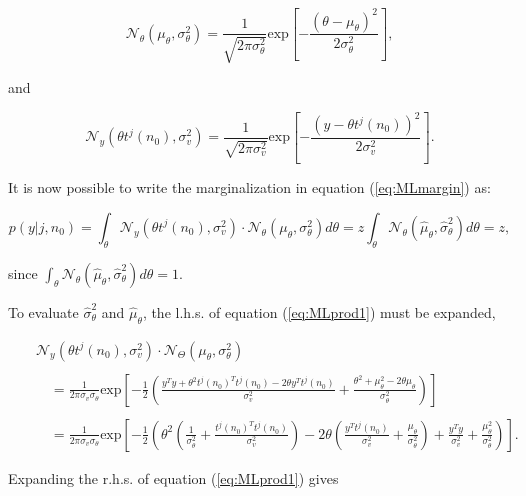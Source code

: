 \begin{equation}\label{eq:MLtheta2}
\mathcal{N}_\theta(\mu_\theta,\sigma^2_\theta) = \frac{1}{\sqrt{2 \pi \sigma_\theta^2}} \textrm{exp}\left[-\frac{\left(\theta - \mu_\theta\right)^2}{2\sigma_\theta^2}\right],
\end{equation}

and

\begin{equation}\label{eq:MLnoise2}
\mathcal{N}_y(\theta t^j(n_0),\sigma_v^2) = \frac{1}{\sqrt{2 \pi \sigma_v^2}} \textrm{exp}\left[-\frac{\left(y - \theta t^j\left(n_0\right)\right)^2}{2\sigma_v^2}\right].
\end{equation}

It is now possible to write the marginalization in equation (\ref{eq:MLmargin}) as:

\begin{equation}\label{eq:MLmargin2}
p(y|j,n_0)=\int_\theta \mathcal{N}_y(\theta t^j(n_0),\sigma_v^2)\cdot\mathcal{N}_\theta(\mu_\theta,\sigma^2_\theta) d\theta = z \int_\theta \mathcal{N}_\theta(\hat{\mu}_\theta,\hat{\sigma}^2_\theta) d\theta = z,
\end{equation}

since $\int_\theta \mathcal{N}_\theta(\hat{\mu}_\theta,\hat{\sigma}^2_\theta) d\theta = 1$.

To evaluate $\hat{\sigma}^2_\theta$ and $\hat{\mu}_\theta$, the l.h.s. of equation (\ref{eq:MLprod1}) must be expanded,

\begin{eqnarray}\label{eq:MLprod3}
& & \mathcal{N}_y(\theta t^j(n_0),\sigma_v^2)\cdot\mathcal{N}_\Theta(\mu_\theta,\sigma^2_\theta) \\\nonumber{}\\\nonumber
& & \quad = \frac{1}{2\pi \sigma_v \sigma_\theta} \textrm{exp}\left[-\frac{1}{2}\left(\frac{y^Ty +\theta^2t^j(n_0)^Tt^j(n_0)-2\theta y^T t^j(n_0)}{\sigma^2_v}+\frac{\theta^2 + \mu^2_\theta-2\theta\mu_\theta}{\sigma_\theta^2}\right)\right]\\\nonumber{}\\\nonumber
& & \quad = \frac{1}{2\pi \sigma_v \sigma_\theta} \textrm{exp}\left[-\frac{1}{2}\left(\theta^2 \left(\frac{1}{\sigma_\theta^2}+\frac{t^j(n_0)^T t^j(n_0)}{\sigma_v^2}\right) - 2\theta\left(\frac{y^T t^j(n_0)}{\sigma_v^2}+\frac{\mu_\theta}{\sigma_\theta^2}\right) + \frac{y^Ty}{\sigma_v^2} +\frac{\mu_\theta^2}{\sigma_\theta^2}\right)\right].
\end{eqnarray}

Expanding the r.h.s. of equation (\ref{eq:MLprod1}) gives

